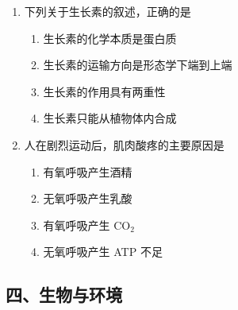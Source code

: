 \begin{enumerate}
  \item[★★] 下列关于生长素的叙述，正确的是
  \begin{enumerate}
    \item[A.] 生长素的化学本质是蛋白质
    \item[B.] 生长素的运输方向是形态学下端到上端
    \item[C.] 生长素的作用具有两重性
    \item[D.] 生长素只能从植物体内合成
  \end{enumerate}
  \vspace{0.8cm}

  \item[★★★] 人在剧烈运动后，肌肉酸疼的主要原因是
  \begin{enumerate}
    \item[A.] 有氧呼吸产生酒精
    \item[B.] 无氧呼吸产生乳酸
    \item[C.] 有氧呼吸产生 CO$_2$
    \item[D.] 无氧呼吸产生 ATP 不足
  \end{enumerate}
  \vspace{1cm}
\end{enumerate}

\subsection{四、生物与环境}

